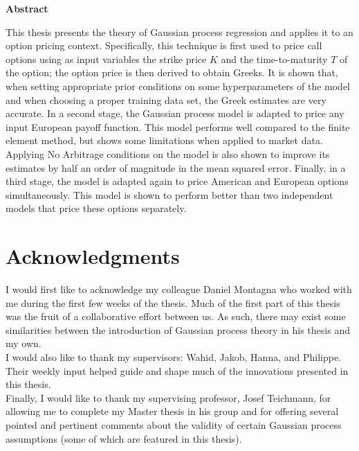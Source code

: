 \documentclass[a4paper,12pt]{article}
\begin{document}


\setcounter{page}{1}

\vspace*{\fill}
\begin{center}
    \large
    \textbf{Abstract}
\end{center}
This thesis presents the theory of Gaussian process regression and applies it to an option pricing context. Specifically, this technique is first used to price call options using as input variables the strike price $K$ and the time-to-maturity $T$ of the option; the option price is then derived to obtain Greeks. It is shown that, when setting appropriate prior conditions on some hyperparameters of the model and when choosing a proper training data set, the Greek estimates are very accurate. In a second stage, the Gaussian process model is adapted to price any input European payoff function. This model performs well compared to the finite element method, but shows some limitations when applied to market data. Applying No Arbitrage conditions on the model is also shown to improve its estimates by half an order of magnitude in the mean squared error. Finally, in a third stage, the model is adapted again to price American and European options simultaneously. This model is shown to perform better than two independent models that price these options separately.

\vspace*{\fill}

\newpage

\section*{Acknowledgments}
I would first like to acknowledge my colleague Daniel Montagna who worked with me during the first few weeks of the thesis. Much of the first part of this thesis was the fruit of a collaborative effort between us. As such, there may exist some similarities between the introduction of Gaussian process theory in his thesis \cite{Montagna2021} and my own.\\
I would also like to thank my supervisors: Wahid, Jakob, Hanna, and Philippe. Their weekly input helped guide and shape much of the innovations presented in this thesis.\\
Finally, I would like to thank my supervising professor, Josef Teichmann, for allowing me to complete my Master thesis in his group and for offering several pointed and pertinent comments about the validity of certain Gaussian process assumptions (some of which are featured in this thesis).
\end{document}
